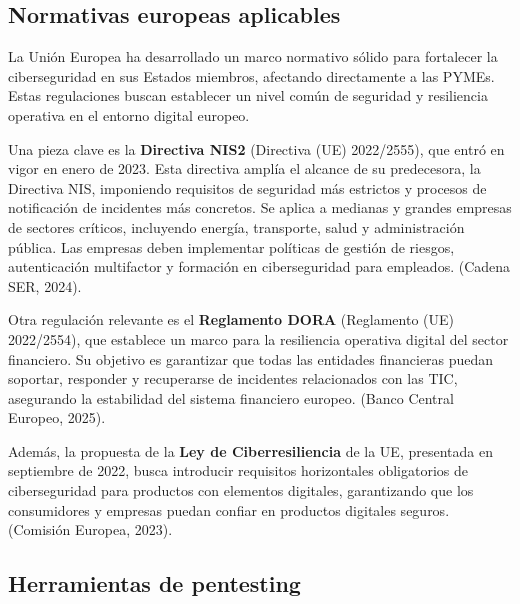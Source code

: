 \documentclass[a4paper, 10pt]{article}
\begin{document}
\subsection{Normativas europeas aplicables}

    La Unión Europea ha desarrollado un marco normativo sólido para fortalecer la ciberseguridad en sus Estados miembros, afectando directamente a las PYMEs. Estas regulaciones buscan establecer un nivel común de seguridad y resiliencia operativa en el entorno digital europeo.
    \par\vspace{0.5cm}

    Una pieza clave es la \textbf{Directiva NIS2} (Directiva (UE) 2022/2555), que entró en vigor en enero de 2023. Esta directiva amplía el alcance de su predecesora, la Directiva NIS, imponiendo requisitos de seguridad más estrictos y procesos de notificación de incidentes más concretos. Se aplica a medianas y grandes empresas de sectores críticos, incluyendo energía, transporte, salud y administración pública. Las empresas deben implementar políticas de gestión de riesgos, autenticación multifactor y formación en ciberseguridad para empleados. (Cadena SER, 2024). \cite{cadena_ser}
    \par\vspace{0.5cm}

    Otra regulación relevante es el \textbf{Reglamento DORA} (Reglamento (UE) 2022/2554), que establece un marco para la resiliencia operativa digital del sector financiero. Su objetivo es garantizar que todas las entidades financieras puedan soportar, responder y recuperarse de incidentes relacionados con las TIC, asegurando la estabilidad del sistema financiero europeo. (Banco Central Europeo, 2025). \cite{bce}
    \par\vspace{0.5cm}

    Además, la propuesta de la \textbf{Ley de Ciberresiliencia} de la UE, presentada en septiembre de 2022, busca introducir requisitos horizontales obligatorios de ciberseguridad para productos con elementos digitales, garantizando que los consumidores y empresas puedan confiar en productos digitales seguros. (Comisión Europea, 2023). \cite{comision_europea}
    

    
\subsection{Herramientas de pentesting}
\end{document}
